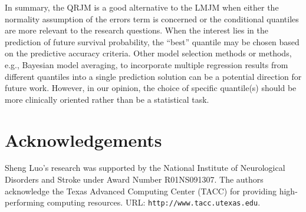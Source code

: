 \documentclass[Crown, sagev, times, doublespace]{sagej}
\begin{document}
In summary, the QRJM is a good alternative to the LMJM when either the normality assumption of the errors term is concerned or the conditional quantiles are more relevant to the research questions. When the interest lies in the prediction of future survival probability, the ``best'' quantile may be chosen based on the predictive accuracy criteria. Other model selection methods or methods, e.g., Bayesian model averaging, to incorporate multiple regression results from different quantiles into a single prediction solution can be a potential direction for future work. However, in our opinion, the choice of specific quantile(s) should be more clinically oriented rather than be a statistical task.


\section*{Acknowledgements}
Sheng Luo's research was supported by the National Institute of Neurological Disorders and Stroke under Award Number R01NS091307. The authors acknowledge the Texas Advanced Computing Center (TACC) for providing high-performing computing resources. URL: \verb"http://www.tacc.utexas.edu".


\end{document}
